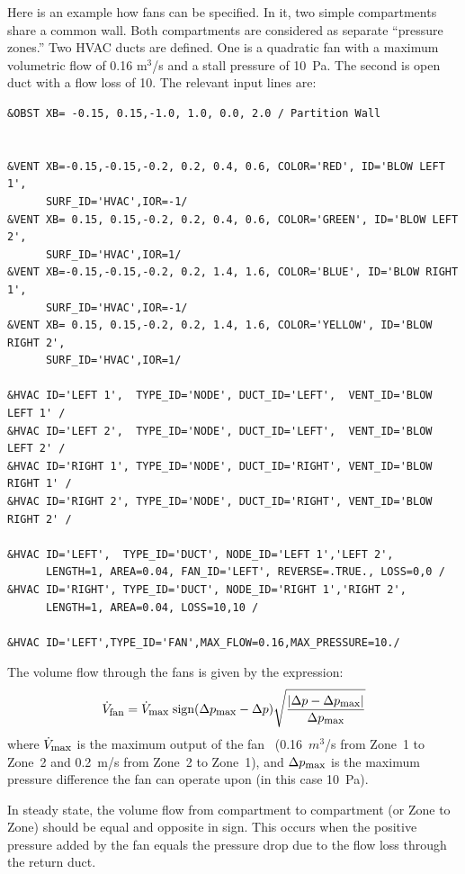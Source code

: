 \documentclass[11pt]{book}
\newcommand{\be}{\begin{equation}}
\newcommand{\ee}{\end{equation}}
\begin{document}
Here is an example how fans can be specified.  In it, two simple
compartments share a common wall. Both compartments are considered as
separate ``pressure zones.'' Two HVAC ducts are defined.  One is a quadratic fan with a maximum volumetric flow of 0.16 m$^3$/s and a stall pressure of 10~Pa.
The second is open duct with a flow loss of 10. The relevant input lines are:

\footnotesize
\begin{verbatim}
&OBST XB= -0.15, 0.15,-1.0, 1.0, 0.0, 2.0 / Partition Wall


&VENT XB=-0.15,-0.15,-0.2, 0.2, 0.4, 0.6, COLOR='RED', ID='BLOW LEFT 1',
      SURF_ID='HVAC',IOR=-1/
&VENT XB= 0.15, 0.15,-0.2, 0.2, 0.4, 0.6, COLOR='GREEN', ID='BLOW LEFT 2',
      SURF_ID='HVAC',IOR=1/
&VENT XB=-0.15,-0.15,-0.2, 0.2, 1.4, 1.6, COLOR='BLUE', ID='BLOW RIGHT 1',
      SURF_ID='HVAC',IOR=-1/
&VENT XB= 0.15, 0.15,-0.2, 0.2, 1.4, 1.6, COLOR='YELLOW', ID='BLOW RIGHT 2',
      SURF_ID='HVAC',IOR=1/

&HVAC ID='LEFT 1',  TYPE_ID='NODE', DUCT_ID='LEFT',  VENT_ID='BLOW LEFT 1' /
&HVAC ID='LEFT 2',  TYPE_ID='NODE', DUCT_ID='LEFT',  VENT_ID='BLOW LEFT 2' /
&HVAC ID='RIGHT 1', TYPE_ID='NODE', DUCT_ID='RIGHT', VENT_ID='BLOW RIGHT 1' /
&HVAC ID='RIGHT 2', TYPE_ID='NODE', DUCT_ID='RIGHT', VENT_ID='BLOW RIGHT 2' /

&HVAC ID='LEFT',  TYPE_ID='DUCT', NODE_ID='LEFT 1','LEFT 2',
      LENGTH=1, AREA=0.04, FAN_ID='LEFT', REVERSE=.TRUE., LOSS=0,0 /
&HVAC ID='RIGHT', TYPE_ID='DUCT', NODE_ID='RIGHT 1','RIGHT 2',
      LENGTH=1, AREA=0.04, LOSS=10,10 /

&HVAC ID='LEFT',TYPE_ID='FAN',MAX_FLOW=0.16,MAX_PRESSURE=10./
\end{verbatim}
\normalsize

\noindent
The volume flow through the fans is given by the expression:
\be \dot{V}_{\hbox{\footnotesize fan}} = \dot{V}_{\hbox{\footnotesize max}} \;
   \hbox{sign} (\Delta p_{\hbox{\footnotesize max}}-\Delta p)
   \sqrt{ \frac{ |\Delta p - \Delta p_{\hbox{\footnotesize max}}|}{\Delta p_{\hbox{\footnotesize max}} } }  \ee
where $\dot{V}_{\hbox{\footnotesize max}}$ is the maximum output of the fan ~(0.16~$m^3$/s from
Zone~1 to Zone~2 and 0.2~m/s from Zone~2 to Zone~1), and $\Delta p_{\hbox{\footnotesize max}}$ is the maximum pressure difference the fan can operate
upon (in this case 10~Pa).

In steady state, the volume flow from compartment to compartment (or Zone to Zone) should be equal and opposite in sign.
This occurs when the positive pressure added by the fan equals the pressure drop due to the flow loss through the return duct.
\end{document}
